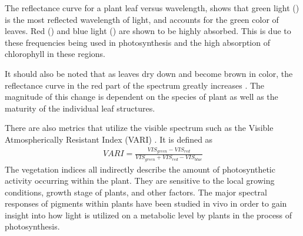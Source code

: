The reflectance curve for a plant leaf versus wavelength, shows that green light () is the most reflected wavelength of light, and accounts for the green color of leaves. Red () and blue light () are shown to be highly absorbed.  This is due to these frequencies being used in photosynthesis and the high absorption of chlorophyll in these regions.

It should also be noted that as leaves dry down and become brown in color, the reflectance curve in the red part of the spectrum greatly increases \cite{photonvegetation}.  The magnitude of this change is dependent on the species of plant as well as the maturity of the individual leaf structures.

There are also metrics that utilize the visible spectrum such as the Visible Atmospherically Resistant Index (VARI) \cite{harris}.  It is defined as
%
\begin{align}
    VARI = \frac{VIS_{green} - VIS_{red}}{VIS_{green} + VIS_{red}-VIS_{blue}}
\end{align}
%
The vegetation indices all indirectly describe the amount of photosynthetic activity occurring within the plant.  They are sensitive to the local growing conditions, growth stage of plants, and other factors. The major spectral responses of pigments within plants have been studied in vivo in order to gain insight into how light is utilized on a metabolic level by plants in the process of photosynthesis.
